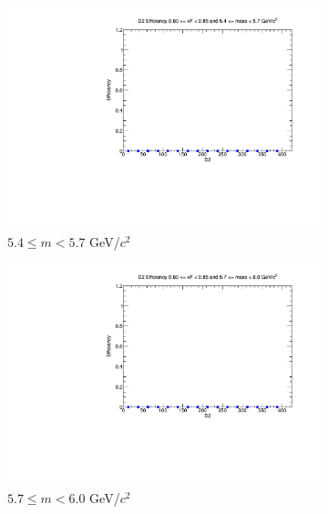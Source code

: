 \documentclass[11pt]{article}
\begin{document}
\begin{figure}[p]
\begin{subfigure}[b]{0.32\textwidth}
        \includegraphics[width=\textwidth]{./kTrackerEfficiencyPlots/D2_Efficiency_xF16_mass4.pdf}
        \caption{$5.4 \leq m < 5.7$ GeV/$c^2$}
    \end{subfigure}\hfill
    \begin{subfigure}[b]{0.32\textwidth}
        \centering
        \includegraphics[width=\textwidth]{./kTrackerEfficiencyPlots/D2_Efficiency_xF16_mass5.pdf}
        \caption{$5.7 \leq m < 6.0$ GeV/$c^2$}
    \end{subfigure}\vspace{0.5cm}
    \begin{subfigure}[b]{0.32\textwidth}
        \centering

\end{subfigure}
\end{figure}
\end{document}
